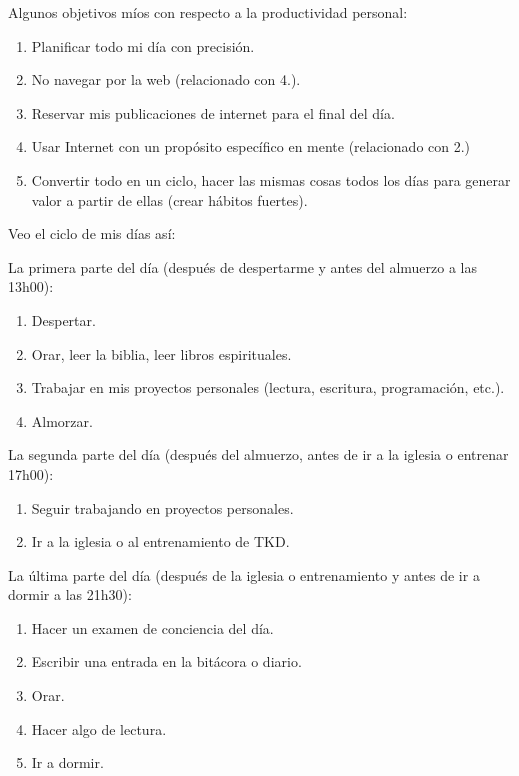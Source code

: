 \documentclass[12pt]{article}
\begin{document}
Algunos objetivos míos con respecto a la productividad personal:

\begin{enumerate}
	\item Planificar todo mi día con precisión.
	\item No navegar por la web (relacionado con 4.).
	\item Reservar mis publicaciones de internet para el final del día.
	\item Usar Internet con un propósito específico en mente (relacionado
		con 2.)
	\item Convertir todo en un ciclo, hacer las mismas cosas todos los días
		para generar valor a partir de ellas (crear hábitos fuertes).
\end{enumerate}

Veo el ciclo de mis días así:

La primera parte del día (después de despertarme y antes del almuerzo a las
13h00):

\begin{enumerate}
	\item Despertar.
	\item Orar, leer la biblia, leer libros espirituales.
	\item Trabajar en mis proyectos personales (lectura, escritura,
		programación, etc.).
	\item Almorzar.
\end{enumerate}

La segunda parte del día (después del almuerzo, antes de ir a la iglesia o
entrenar 17h00):

\begin{enumerate}
	\item Seguir trabajando en proyectos personales.
	\item Ir a la iglesia o al entrenamiento de TKD.
\end{enumerate}

La última parte del día (después de la iglesia o entrenamiento y antes de ir a
dormir a las 21h30):

\begin{enumerate}
	\item Hacer un examen de conciencia del día.
	\item Escribir una entrada en la bitácora o diario.
	\item Orar.
	\item Hacer algo de lectura.
	\item Ir a dormir.
\end{enumerate}
\end{document}
